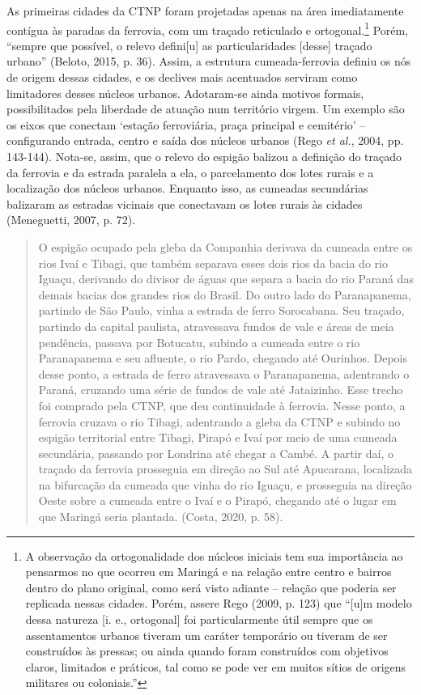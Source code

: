 \documentclass[12pt, a4paper]{book} %
\begin{document}
        As primeiras cidades da CTNP foram projetadas apenas na área imediatamente contígua às paradas da ferrovia, com um traçado reticulado e ortogonal.\footnote[94]{A observação da ortogonalidade dos núcleos iniciais tem sua importância ao pensarmos no que ocorreu em Maringá e na relação entre centro e bairros dentro do plano original, como será visto adiante – relação que poderia ser replicada nessas cidades. Porém, assere Rego (2009, p. 123) que ``[u]m modelo dessa natureza [i. e., ortogonal] foi particularmente útil sempre que os assentamentos urbanos tiveram um caráter temporário ou tiveram de ser construídos às pressas; ou ainda quando foram construídos com objetivos claros, limitados e práticos, tal como se pode ver em muitos sítios de origens militares ou coloniais.''} Porém, ``sempre que possível, o relevo defini[u] as particularidades [desse] traçado urbano'' (Beloto, 2015, p. 36). Assim, a estrutura cumeada-ferrovia definiu os nós de origem dessas cidades, e os declives mais acentuados serviram como limitadores desses núcleos urbanos. Adotaram-se ainda motivos formais, possibilitados pela liberdade de atuação num território virgem. Um exemplo são os eixos que conectam `estação ferroviária, praça principal e cemitério' – configurando entrada, centro e saída dos núcleos urbanos (Rego \textit{et al.}, 2004, pp. 143-144). Nota-se, assim, que o relevo do espigão balizou a definição do traçado da ferrovia e da estrada paralela a ela, o parcelamento dos lotes rurais e a localização dos núcleos urbanos. Enquanto isso, as cumeadas secundárias balizaram as estradas vicinais que conectavam os lotes rurais às cidades (Meneguetti, 2007, p. 72).%

        \begin{quotation}
            O espigão ocupado pela gleba da Companhia derivava da cumeada entre os rios Ivaí e Tibagi, que também separava esses dois rios da bacia do rio Iguaçu, derivando do divisor de águas que separa a bacia do rio Paraná das demais bacias dos grandes rios do Brasil. Do outro lado do Paranapanema, partindo de São Paulo, vinha a estrada de ferro Sorocabana. Seu traçado, partindo da capital paulista, atravessava fundos de vale e áreas de meia pendência, passava por Botucatu, subindo a cumeada entre o rio Paranapanema e seu afluente, o rio Pardo, chegando até Ourinhos. Depois desse ponto, a estrada de ferro atravessava o Paranapanema, adentrando o Paraná, cruzando uma série de fundos de vale até Jataizinho. Esse trecho foi comprado pela CTNP, que deu continuidade à ferrovia. Nesse ponto, a ferrovia cruzava o rio Tibagi, adentrando a gleba da CTNP e subindo no espigão territorial entre Tibagi, Pirapó e Ivaí por meio de uma cumeada secundária, passando por Londrina até chegar a Cambé. A partir daí, o traçado da ferrovia prosseguia em direção ao Sul até Apucarana, localizada na bifurcação da cumeada que vinha do rio Iguaçu, e prosseguia na direção Oeste sobre a cumeada entre o Ivaí e o Pirapó, chegando até o lugar em que Maringá seria plantada. (Costa, 2020, p. 58).
        \end{quotation}
\end{document}
